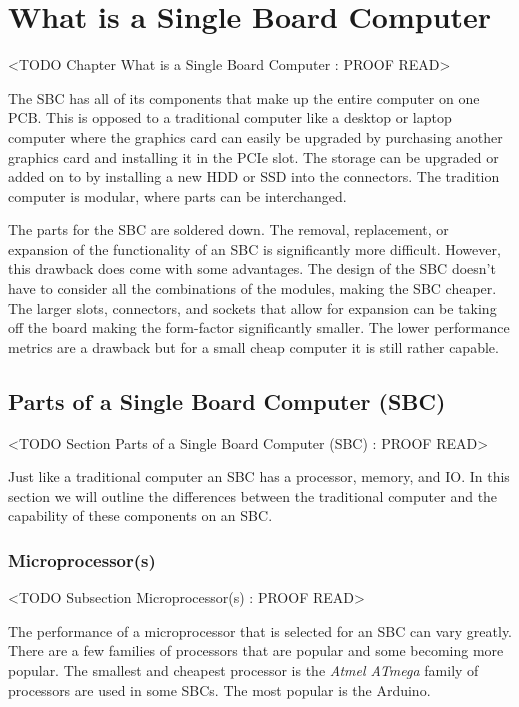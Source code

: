 \chapter{What is a Single Board Computer}
	<TODO Chapter What is a Single Board Computer : PROOF READ>

The \ac{SBC} has all of its components that make up the entire computer on one \ac{PCB}. This is opposed to a traditional computer like a desktop or laptop computer where the graphics card can easily be upgraded by purchasing another graphics card and installing it in the \ac{PCIe} slot. The storage can be upgraded or added on to by installing a new \ac{HDD} or \ac{SSD} into the connectors. The tradition computer is modular, where parts can be interchanged.

The parts for the \ac{SBC} are soldered down. The removal, replacement, or expansion of the functionality of an \ac{SBC} is significantly more difficult. However, this drawback does come with some advantages. The design of the \ac{SBC} doesn't have to consider all the combinations of the modules, making the \ac{SBC} cheaper. The larger slots, connectors, and sockets that allow for expansion can be taking off the board making the form-factor significantly smaller. The lower performance metrics are a drawback but for a small cheap computer it is still rather capable.

\section{Parts of a Single Board Computer (SBC)}
	<TODO Section Parts of a Single Board Computer (SBC) : PROOF READ>

Just like a traditional computer an \ac{SBC} has a processor, memory, and \ac{IO}. In this section we will outline the differences between the traditional computer and the capability of these components on an \ac{SBC}.
	
\subsection{Microprocessor(s)}
	<TODO Subsection Microprocessor(s) : PROOF READ>

The performance of a microprocessor that is selected for an \ac{SBC} can vary greatly. There are a few families of processors that are popular and some becoming more popular. The smallest and cheapest processor is the \emph{Atmel ATmega} family of processors are used in some \ac{SBC}s. The most popular is the Arduino.


